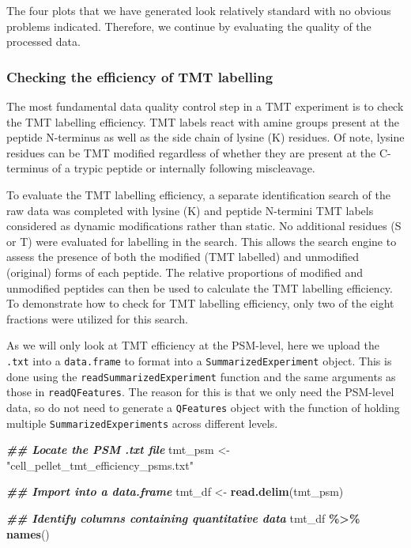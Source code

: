 \documentclass[9pt,a4paper,]{extarticle}
\newenvironment{Shaded}{\begin{snugshade}}{\end{snugshade}}
\newcommand{\DocumentationTok}[1]{\textcolor[rgb]{0.56,0.35,0.01}{\textbf{\textit{#1}}}}
\newcommand{\FunctionTok}[1]{\textcolor[rgb]{0.13,0.29,0.53}{\textbf{#1}}}
\newcommand{\NormalTok}[1]{#1}
\newcommand{\OtherTok}[1]{\textcolor[rgb]{0.56,0.35,0.01}{#1}}
\newcommand{\SpecialCharTok}[1]{\textcolor[rgb]{0.81,0.36,0.00}{\textbf{#1}}}
\newcommand{\StringTok}[1]{\textcolor[rgb]{0.31,0.60,0.02}{#1}}
\begin{document}
The four plots that we have generated look relatively standard with no obvious
problems indicated. Therefore, we continue by evaluating the quality of the
processed data.

\subsubsection{Checking the efficiency of TMT labelling}\label{checking-the-efficiency-of-tmt-labelling}

The most fundamental data quality control step in a TMT experiment is to check
the TMT labelling efficiency. TMT labels react with amine groups present at the
peptide N-terminus as well as the side chain of lysine (K) residues. Of note,
lysine residues can be TMT modified regardless of whether they are present at the
C-terminus of a trypic peptide or internally following miscleavage.

To evaluate the TMT labelling efficiency, a separate identification search of the
raw data was completed with lysine (K) and peptide N-termini TMT labels
considered as dynamic modifications rather than static. No additional residues
(S or T) were evaluated for labelling in the search. This allows the search
engine to assess the presence of both the modified (TMT labelled) and unmodified
(original) forms of each peptide. The relative proportions of modified and
unmodified peptides can then be used to calculate the TMT labelling efficiency.
To demonstrate how to check for TMT labelling efficiency, only two of the eight
fractions were utilized for this search.

As we will only look at TMT efficiency at the PSM-level, here we upload the \texttt{.txt}
into a \texttt{data.frame} to format into a \texttt{SummarizedExperiment} object. This is done
using the \texttt{readSummarizedExperiment} function and the same arguments as those
in \texttt{readQFeatures}. The reason for this is that we only need the PSM-level data,
so do not need to generate a \texttt{QFeatures} object with the function of holding
multiple \texttt{SummarizedExperiments} across different levels.

\begin{Shaded}
\begin{Highlighting}[]
\DocumentationTok{\#\# Locate the PSM .txt file}
\NormalTok{tmt\_psm }\OtherTok{\textless{}{-}} \StringTok{"cell\_pellet\_tmt\_efficiency\_psms.txt"}

\DocumentationTok{\#\# Import into a data.frame}
\NormalTok{tmt\_df }\OtherTok{\textless{}{-}} \FunctionTok{read.delim}\NormalTok{(tmt\_psm)}

\DocumentationTok{\#\# Identify columns containing quantitative data}
\NormalTok{tmt\_df }\SpecialCharTok{\%\textgreater{}\%}
  \FunctionTok{names}\NormalTok{()}
\end{Highlighting}
\end{Shaded}
\end{document}
